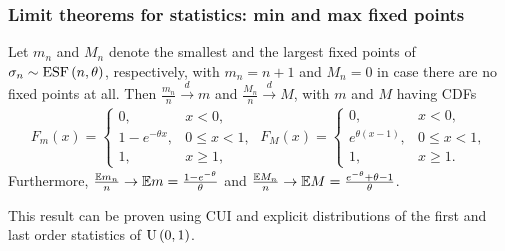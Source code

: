 \documentclass[12pt,pdf,aspectratio=169,t]{beamer}
\begin{document}
    \begin{frame}
        \frametitle{Limit theorems for statistics: min and max fixed points}
        \begin{theorem}
            Let $m_n$ and $M_n$ denote the smallest and the largest fixed points of $\sigma_n \sim \mathrm{ESF}\left(n, \theta\right)$,
            respectively, with $m_n = n+1$ and $M_n = 0$ in case there are no fixed points at all.
            Then $\frac{m_n}{n} \overset{d}{\longrightarrow} m$ and $\frac{M_n}{n} \overset{d}{\longrightarrow} M$,
            with $m$ and $M$ having CDFs 
            \begin{gather}
                F_m(x) = \begin{cases}
                    0, & x < 0, \\
                    1 - e^{-\theta x}, & 0 \leq x < 1, \\
                    1, & x \geq 1,
                \end{cases}\;
                F_M(x) = \begin{cases}
                    0, & x < 0, \\
                    e^{\theta(x - 1)}, & 0 \leq x < 1, \\
                        1, & x \geq 1.
                \end{cases}
            \end{gather}
            Furthermore, $\frac{\mathbb{E} m_n}{n} \to \mathbb{E} m = \frac{1 - e^{-\theta}}{\theta}$
            and $\frac{\mathbb{E} M_n}{n} \to \mathbb{E} M = \frac{e^{-\theta} + \theta - 1}{\theta}$.
        \end{theorem}
        This result can be proven using CUI and explicit distributions
        of the first and last order statistics of $\mathrm{U}\left(0, 1\right)$.
    \end{frame}
\end{document}
